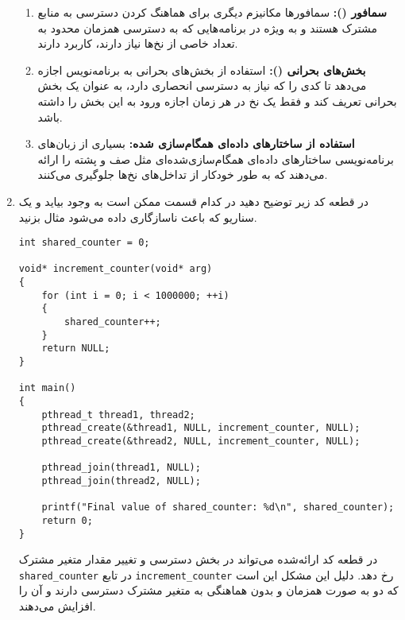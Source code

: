 \begin{enumerate}
\begin{qsolve}
\begin{enumerate}
		
		\item 
		\textbf{سمافور ():} سمافورها مکانیزم دیگری برای هماهنگ کردن دسترسی به منابع مشترک هستند و به ویژه در برنامه‌هایی که به دسترسی همزمان محدود به تعداد خاصی از نخ‌ها نیاز دارند، کاربرد دارند.
		
		
		\item 
		\textbf{بخش‌های بحرانی ():} استفاده از بخش‌های بحرانی به برنامه‌نویس اجازه می‌دهد تا کدی را که نیاز به دسترسی انحصاری دارد، به عنوان یک بخش بحرانی تعریف کند و فقط یک نخ در هر زمان اجازه ورود به این بخش را داشته باشد.
		
		
		\item 
		\textbf{استفاده از ساختارهای داده‌ای همگام‌سازی شده:} بسیاری از زبان‌های برنامه‌نویسی ساختارهای داده‌ای همگام‌سازی‌شده‌ای مثل صف و پشته را ارائه می‌دهند که به طور خودکار از تداخل‌های نخ‌ها جلوگیری می‌کنند.
	\end{enumerate}
	
	\end{qsolve}
	
	
	
	
	\item 
	در قطعه کد زیر توضیح دهید  در کدام قسمت ممکن است به وجود بیاید و یک سناریو که باعث ناسازگاری داده می‌شود مثال بزنید.
	
\begin{latin}
\begin{lstlisting}[caption=Code of Q2, label=cpp_code_example]
int shared_counter = 0;

void* increment_counter(void* arg) 
{
	for (int i = 0; i < 1000000; ++i) 
	{
		shared_counter++;
	}
	return NULL;
}

int main() 
{
	pthread_t thread1, thread2;
	pthread_create(&thread1, NULL, increment_counter, NULL);
	pthread_create(&thread2, NULL, increment_counter, NULL);
	
	pthread_join(thread1, NULL);
	pthread_join(thread2, NULL);
	
	printf("Final value of shared_counter: %d\n", shared_counter);
	return 0;
}
\end{lstlisting}
\end{latin}
	
	
	
	
	
	\begin{qsolve}
		در قطعه کد ارائه‌شده  می‌تواند در بخش دسترسی و تغییر مقدار متغیر مشترک \texttt{shared\_counter} در تابع \texttt{increment\_counter} رخ دهد. دلیل این مشکل این است که دو  به صورت همزمان و بدون هماهنگی به متغیر مشترک دسترسی دارند و آن را افزایش می‌دهند.
		

\end{qsolve}
\end{enumerate}
